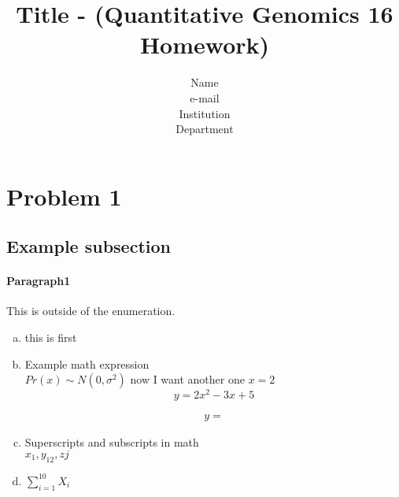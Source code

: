 \documentclass{article}
\begin{document}
\title{Title - (Quantitative Genomics 16 Homework)}  %

\author{Name \\ e-mail \\ Institution \\ Department} %


\maketitle

\section*{Problem 1}
\subsection*{Example subsection}
\paragraph {Paragraph1}This is outside of the enumeration.
\
	\begin{enumerate}[a.]
	
	\item this is first 
	
	\item Example math expression \\

	$Pr(x) \sim N(0, \sigma^2) $ now I want another one $x = 2$ \\
	
	
	
	$$ y = 2x^2 - 3x + 5$$
	
	\begin{multline}
		y = 
	\end{multline}
	
	\item Superscripts and subscripts in math \\
	$x_1, y_{12}, z{j}$ \\
	
	\item $\sum_{i = 1}^{10} X_i$
	
		
	\end{enumerate}
	
\end{document}
